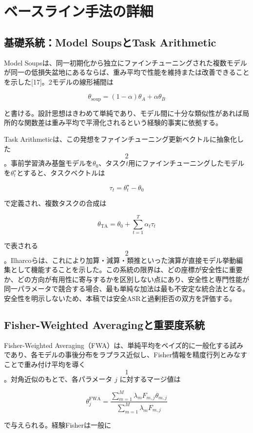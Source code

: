 \documentclass{article}
\begin{document}
\section{ベースライン手法の詳細}
\subsection{基礎系統：Model SoupsとTask Arithmetic}

Model Soupsは、同一初期化から独立にファインチューニングされた複数モデルが同一の低損失盆地にあるならば、重み平均で性能を維持または改善できることを示した[17]。2モデルの線形補間は

\[
\theta_{\mathrm{soup}}=(1-\alpha)\theta_A+\alpha\theta_B
\tag{1}
\]

と書ける。設計思想はきわめて単純であり、モデル間に十分な類似性があれば局所的な関数差は重み平均で平滑化されるという経験的事実に依拠する。

Task Arithmeticは、この発想をファインチューニング更新ベクトルに抽象化した\[2\]。事前学習済み基盤モデルを\(\theta_0\)、タスク\(t\)用にファインチューニングしたモデルを\(\theta_t^\star\)とすると、タスクベクトルは

\[
\tau_t=\theta_t^\star-\theta_0
\tag{2}
\]

で定義され、複数タスクの合成は

\[
\theta_{\mathrm{TA}}=\theta_0+\sum_{t=1}^{T}\alpha_t\tau_t
\tag{3}
\]

で表される\[2\]。Ilharcoらは、これにより加算・減算・類推といった演算が直接モデル挙動編集として機能することを示した。この系統の限界は、どの座標が安全性に重要か、どの方向が有用性に寄与するかを区別しない点にあり、安全性と専門性能が同一パラメータで競合する場合、最も単純な加法は最も不安定な統合法となる。安全性を明示しないため、本稿では安全ASRと過剰拒否の双方を評価する。

\subsection{Fisher-Weighted Averagingと重要度系統}

Fisher-Weighted Averaging（FWA）は、単純平均をベイズ的に一般化する試みであり、各モデルの事後分布をラプラス近似し、Fisher情報を精度行列とみなすことで重み付け平均を導く\[1\]。対角近似のもとで、各パラメータ \(j\) に対するマージ値は

\[
\theta_j^{\mathrm{FWA}}=\frac{\sum_{m=1}^{M}\lambda_m F_{m,j}\theta_{m,j}}{\sum_{m=1}^{M}\lambda_m F_{m,j}}
\tag{4}
\]

で与えられる。経験Fisherは一般に
\end{document}

